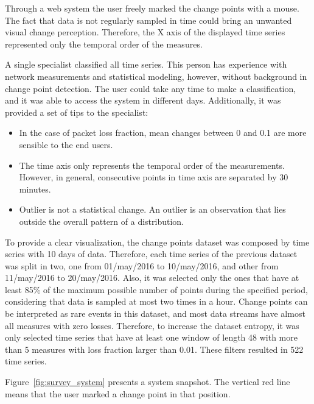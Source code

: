 Through a web system the user freely marked the change points with a mouse.
The fact that data is not regularly sampled in time could bring an unwanted
visual change perception. Therefore, the X axis of the displayed time series
represented only the temporal order of the measures.

A single specialist classified all time series.
This person has experience with network measurements and statistical modeling,
however, without background in change point detection.
The user could take any time to make a classification, and it was able to access
the system in different days. Additionally, it was provided a set of tips to the
specialist:

\begin{itemize}
    \item In the case of packet loss fraction, mean changes between 0 and 0.1
    are more sensible to the end users.
    \item The time axis only represents the temporal order of the measurements.
    However, in general, consecutive points in time axis are separated by 30
    minutes.
    \item Outlier is not a statistical change. An outlier is an observation that
    lies outside the overall pattern of a distribution.
\end{itemize}

To provide a clear visualization, the change points dataset was composed by time
series with 10 days of data. Therefore, each time series of the previous dataset
was split in two, one from 01/may/2016 to 10/may/2016, and other from
11/may/2016 to 20/may/2016. Also, it was selected only the ones that have at
least 85\% of the maximum possible number of points during the specified period,
considering that data is sampled at most two times in a hour. Change points can
be interpreted as rare events in this dataset, and most data streams have almost
all measures with zero losses. Therefore, to increase the dataset entropy,
it was only selected time series that have at least one window of length 48 with
more than 5 measures with loss fraction larger than 0.01. These filters resulted
in 522 time series.

Figure~\ref{fig:survey_system} presents a system snapshot.
The vertical red line means that the user marked a change point in that position.

